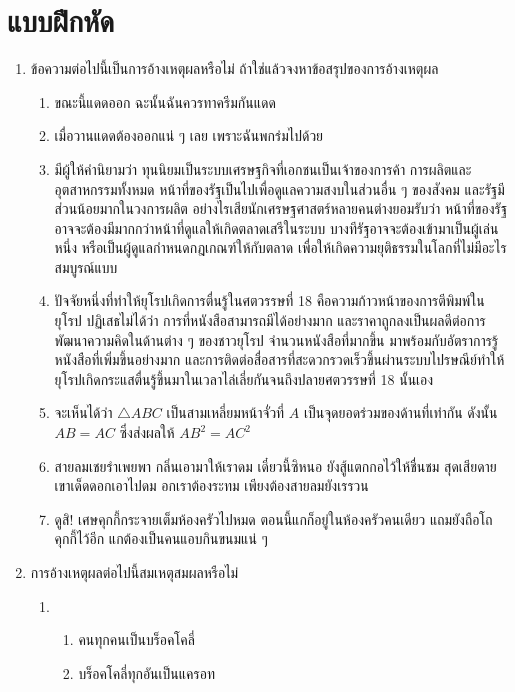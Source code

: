 \documentclass[a4paper,12pt]{extbook}
\theoremstyle{definition}
\theoremstyle{remark}
\begin{document}
			\section{แบบฝึกหัด}
			\begin{enumerate}
				\item ข้อความต่อไปนี้เป็นการอ้างเหตุผลหรือไม่ ถ้าใช่แล้วจงหาข้อสรุปของการอ้างเหตุผล
				\begin{enumerate}[label={(\arabic*)}]
					\item ขณะนี้แดดออก ฉะนั้นฉันควรทาครีมกันแดด
					\item เมื่อวานแดดต้องออกแน่ ๆ เลย เพราะฉันพกร่มไปด้วย
					\item มีผู้ให้คำนิยามว่า ทุนนิยมเป็นระบบเศรษฐกิจที่เอกชนเป็นเจ้าของการค้า การผลิตและอุตสาหกรรมทั้งหมด หน้าที่ของรัฐเป็นไปเพื่อดูแลความสงบในส่วนอื่น ๆ ของสังคม และรัฐมีส่วนน้อยมากในวงการผลิต อย่างไรเสียนักเศรษฐศาสตร์หลายคนต่างยอมรับว่า หน้าที่ของรัฐอาจจะต้องมีมากกว่าหน้าที่ดูแลให้เกิดตลาดเสรีในระบบ บางทีรัฐอาจจะต้องเข้ามาเป็นผู้เล่นหนึ่ง หรือเป็นผู้ดูแลกำหนดกฎเกณฑ์ให้กับตลาด เพื่อให้เกิดความยุติธรรมในโลกที่ไม่มีอะไรสมบูรณ์แบบ
					\item ปัจจัยหนึ่งที่ทำให้ยุโรปเกิดการตื่นรู้ในศตวรรษที่ 18 คือความก้าวหน้าของการตีพิมพ์ในยุโรป ปฏิเสธไม่ได้ว่า การที่หนังสือสามารถมีได้อย่างมาก และราคาถูกลงเป็นผลดีต่อการพัฒนาความคิดในด้านต่าง ๆ ของชาวยุโรป จำนวนหนังสือที่มากขึ้น มาพร้อมกับอัตราการรู้หนังสือที่เพิ่มขึ้นอย่างมาก และการติดต่อสื่อสารที่สะดวกรวดเร็วขึ้นผ่านระบบไปรษณีย์ทำให้ยุโรปเกิดกระแสตื่นรู้ขึ้นมาในเวลาไล่เลี่ยกันจนถึงปลายศตวรรษที่ 18 นั้นเอง
					\item จะเห็นได้ว่า $\triangle ABC$ เป็นสามเหลี่ยมหน้าจั่วที่ $A$ เป็นจุดยอดร่วมของด้านที่เท่ากัน ดังนั้น $AB = AC$ ซึ่งส่งผลให้ $AB^2 = AC^2$
					\item สายลมเชยรำเพยพา กลิ่นเอามาให้เราดม เดี๋ยวนี้ซิหนอ ยังสู้แตกกอไว้ให้ชื่นชม สุดเสียดายเขาเด็ดดอกเอาไปดม อกเราต้องระทม เพียงต้องสายลมยังเรรวน
					\item ดูสิ! เศษคุกกี้กระจายเต็มห้องครัวไปหมด ตอนนี้แกก็อยู่ในห้องครัวคนเดียว แถมยังถือโถคุกกี้ไว้อีก แกต้องเป็นคนแอบกินขนมแน่ ๆ
				\end{enumerate}
				\item การอ้างเหตุผลต่อไปนี้สมเหตุสมผลหรือไม่
				\begin{enumerate}[label={(\arabic*)}]
					\item \begin{enumerate}[label={\arabic*.}]
						\item คนทุกคนเป็นบร็อคโคลี่
						\item บร็อคโคลี่ทุกอันเป็นแครอท

\end{enumerate}
\end{enumerate}
\end{enumerate}
\end{document}
